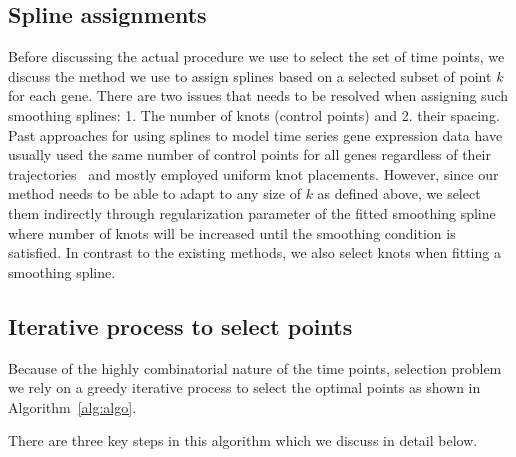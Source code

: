 \documentclass[10pt]{article}
\begin{document}
\subsection{Spline assignments}

Before discussing the actual procedure we use to select the set of
time points, we discuss the method we use to assign splines based on
a selected subset of point $k$ for each gene. There are two issues
that needs to be resolved when assigning such smoothing splines: 1.
The number of knots (control points) and 2. their spacing. Past
approaches for using splines to model time series gene expression
data have usually used the same number of control points for all
genes regardless of their trajectories~\cite{bar2012, singh2005} and mostly employed uniform
knot placements. However, since our method needs to be able to adapt
to any size of $k$ as defined above, we select them indirectly through
regularization parameter of the fitted smoothing spline where number
of knots will be increased until the smoothing condition is
satisfied. In contrast to the existing methods, we also select knots when fitting a smoothing spline.

\subsection{Iterative process to select points}\label{sec:mainalgo}

Because of the highly combinatorial nature of the time points, selection problem we rely on a greedy iterative process to select
the optimal points as shown in Algorithm~\ref{alg:algo}.

There are three key steps in this algorithm which we discuss in
detail below.
\end{document}
